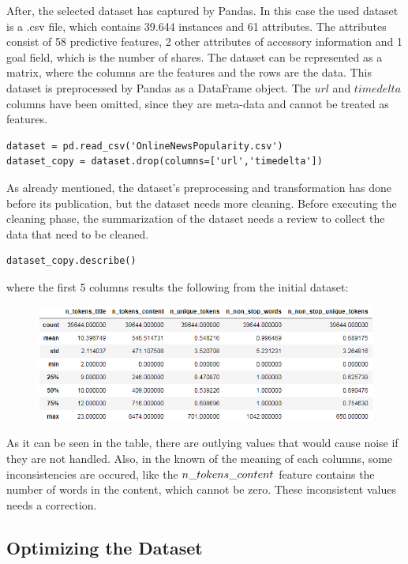 After, the selected dataset has captured by Pandas. In this case the used dataset is a .csv file, which contains 39.644 instances and 61 attributes. The attributes consist of 58 predictive features, 2 other attributes of accessory information and 1 goal field, which is the number of shares. The dataset can be represented as a matrix, where the columns are the features and the rows are the data. This dataset is preprocessed by Pandas as a DataFrame object. The $url$ and $timedelta$ columns have been omitted, since they are meta-data and cannot be treated as features. 
\begin{lstlisting}
dataset = pd.read_csv('OnlineNewsPopularity.csv')
dataset_copy = dataset.drop(columns=['url','timedelta'])
\end{lstlisting}

\medskip As already mentioned, the dataset's preprocessing and transformation has done before its publication, but the dataset needs more cleaning. Before executing the cleaning phase, the summarization of the dataset needs a review to collect the data that need to be cleaned.
\begin{lstlisting}
dataset_copy.describe()
\end{lstlisting}
where the first 5 columns results the following from the initial dataset:
\begin{figure}[h]
	\centering
	\includegraphics[height=0.34\linewidth]{./figures/describe1}
	\label{fig:describe1}
\end{figure}

\noindent As it can be seen in the table, there are outlying values that would cause noise if they are not handled. Also, in the known of the meaning of each columns, some inconsistencies are occured, like the $n\char`_tokens\char`_content$ feature contains the number of words in the content, which cannot be zero. These inconsistent values needs a correction.


\subsection{Optimizing the Dataset}

